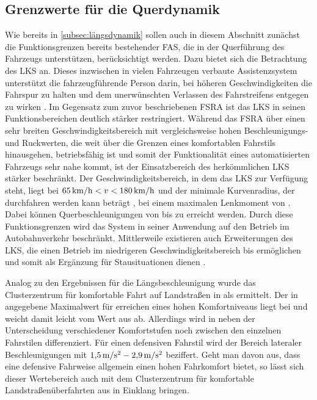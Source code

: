 \subsection{Grenzwerte für die Querdynamik} \label{subsec:querdynamik}
Wie bereits in \ref{subsec:längsdynamik} sollen auch in diesem Abschnitt zunächst die Funktionsgrenzen bereits bestehender \gls{FAS}, die  in der Querführung des Fahrzeugs unterstützen, berücksichtigt werden. Dazu bietet sich die Betrachtung des \gls{LKS} an. Dieses inzwischen in vielen Fahrzeugen verbaute Assistenzsystem unterstützt die fahrzeugführende Person darin, bei höheren Geschwindigkeiten die Fahrspur zu halten und dem unerwünschten Verlassen des Fahrstreifens entgegen zu wirken \cite{Gayko.2012}. Im Gegensatz zum zuvor beschriebenen \gls{FSRA} ist das \gls{LKS} in seinen Funktionsbereichen deutlich stärker restringiert. Während das \gls{FSRA} über einen sehr breiten Geschwindigkeitsbereich mit vergleichsweise hohen Beschleunigungs- und Ruckwerten, die weit über die Grenzen eines komfortablen Fahrstils hinausgehen, betriebsfähig ist und somit der Funktionalität eines automatisierten Fahrzeugs sehr nahe kommt, ist der Einsatzbereich des herkömmlichen \gls{LKS} stärker beschränkt. Der Geschwindigkeitsbereich, in dem das \gls{LKS} zur Verfügung steht, liegt bei $65\,\mathrm{km/h}<v<180\,\mathrm{km/h}$ und der minimale Kurvenradius, der durchfahren werden kann beträgt , bei einem maximalen Lenkmoment von  \cite{Gayko.2012}. Dabei können Querbeschleunigungen von bis zu  erreicht werden. Durch diese Funktionsgrenzen wird das System in seiner Anwendung auf den Betrieb im Autobahnverkehr beschränkt. Mittlerweile existieren auch Erweiterungen des \gls{LKS}, die einen Betrieb im niedrigeren Geschwindigkeitsbereich bis  ermöglichen und somit als Ergänzung für Stausituationen dienen \cite{Oschlies.2019}.

Analog zu den Ergebnissen für die Längsbeschleunigung wurde das Clusterzentrum für komfortable Fahrt auf Landstraßen in \cite{Radke.2013} als  ermittelt. Der in \cite{Schwab.2019} angegebene Maximalwert für erreichen eines hohen Komfortniveaus liegt bei  und weicht damit leicht vom Wert aus \cite{Radke.2013} ab. Allerdings wird in \cite{Schwab.2019} neben der Unterscheidung verschiedener Komfortstufen noch zwischen den einzelnen Fahrstilen differenziert. Für einen defensiven Fahrstil wird der Bereich lateraler Beschleunigungen mit $1{,}5\,\mathrm{m/s^2}-2{,}9\,\mathrm{m/s^2}$ beziffert. Geht man davon aus, dass eine defensive Fahrweise allgemein einen hohen Fahrkomfort bietet, so lässt sich dieser Wertebereich auch mit dem Clusterzentrum für komfortable Landstraßenüberfahrten aus \cite{Radke.2013} in Einklang bringen. 

